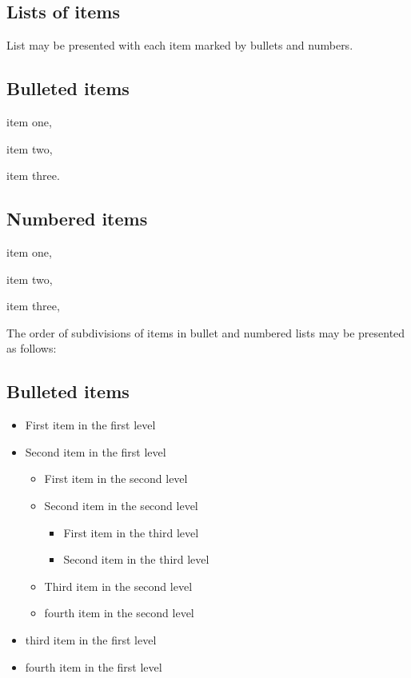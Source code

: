 \documentclass{ws-jmmb}
\begin{document}
\subsection{Lists of items}

List may be presented with each item marked by bullets and numbers.

\subsection*{Bulleted items}

\begin{itemlist}
 \item item one,
 \item item two,
 \item item three.
\end{itemlist}

\subsection*{Numbered items}

\begin{arabiclist}
 \item item one,
 \item item two,
 \item item three,
\end{arabiclist}

The order of subdivisions of items in bullet and numbered lists
may be presented as follows:

\subsection*{Bulleted items}

\begin{itemize}
\item First item in the first level
\item Second item in the first level
\begin{itemize}
\item First item in the second level 
\item Second item in the second level
\begin{itemize}
\item First item in the third level 
\item Second item in the third level
\end{itemize}
\item Third item in the second level
\item fourth item in the second level
\end{itemize}
\item third item in the first level
\item fourth item in the first level
\end{itemize}
\end{document}
